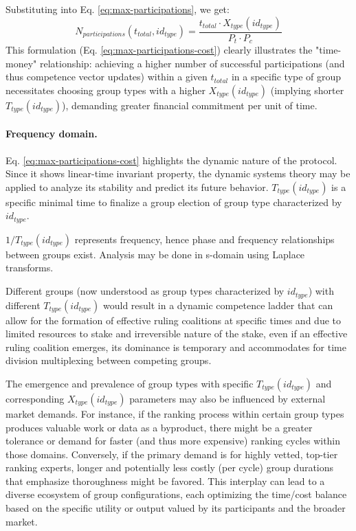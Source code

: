 \documentclass{article}
\begin{document}
\begin{CJK}{UTF8}{gbsn}
        Substituting into Eq. \ref{eq:max-participations}, we get:
        \begin{equation}
            \label{eq:max-participations-cost} %
            N_{participations}(t_{total}, id_{type}) = \dfrac{t_{total} \cdot X_{type}(id_{type})}{P_t \cdot P_c}
        \end{equation}
        This formulation (Eq. \ref{eq:max-participations-cost}) clearly illustrates the "time-money" relationship: achieving a higher number of successful participations (and thus competence vector updates) within a given $t_{total}$ in a specific type of group necessitates choosing group types with a higher $X_{type}(id_{type})$ (implying shorter $T_{type}(id_{type})$), demanding greater financial commitment per unit of time.

        \paragraph*{Frequency domain.} Eq. \ref{eq:max-participations-cost} highlights the dynamic nature of the protocol. Since it shows linear-time invariant property, the dynamic systems theory \cite{Lynn86} may be applied to analyze its stability and predict its future behavior. $T_{type}(id_{type})$ is a specific minimal time to finalize a group election of group type characterized by $id_{type}$.

    $1/T_{type}(id_{type})$ represents frequency, hence phase and frequency relationships between groups exist. Analysis may be done in s-domain using Laplace transforms.

        Different groups (now understood as group types characterized by $id_{type}$) with different $T_{type}(id_{type})$ would result in a dynamic competence ladder that can allow for the formation of effective ruling coalitions at specific times and due to limited resources to stake and irreversible nature of the stake, even if an effective ruling coalition emerges, its dominance is temporary and accommodates for time division multiplexing between competing groups.

        The emergence and prevalence of group types with specific $T_{type}(id_{type})$ and corresponding $X_{type}(id_{type})$ parameters may also be influenced by external market demands. For instance, if the ranking process within certain group types produces valuable work or data as a byproduct, there might be a greater tolerance or demand for faster (and thus more expensive) ranking cycles within those domains. Conversely, if the primary demand is for highly vetted, top-tier ranking experts, longer and potentially less costly (per cycle) group durations that emphasize thoroughness might be favored. This interplay can lead to a diverse ecosystem of group configurations, each optimizing the time/cost balance based on the specific utility or output valued by its participants and the broader market.


\end{CJK}
\end{document}
